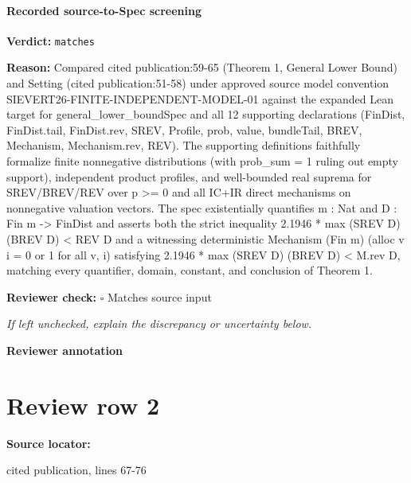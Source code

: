 \documentclass[10pt]{article}
\newcommand{\reviewerbox}{%
  \par\noindent\fbox{\parbox{0.96\linewidth}{\rule{0pt}{0.38in}}}\par
}
\newcommand{\reviewmatch}[1]{%
  \par\noindent\textbf{Reviewer check:} $\square$\; #1\par
  \noindent\emph{If left unchecked, explain the discrepancy or uncertainty below.}\par
}
\begin{document}
\paragraph{Recorded source-to-Spec screening}
\textbf{Verdict:} \texttt{matches}
\\
{\raggedright
\textbf{Reason:} Compared cited publication:\allowbreak{}59-\allowbreak{}65 (Theorem 1, General Lower Bound) and Setting (cited publication:\allowbreak{}51-\allowbreak{}58) under approved source model convention SIEVERT26-\allowbreak{}FINITE-\allowbreak{}INDEPENDENT-\allowbreak{}MODEL-\allowbreak{}01 against the expanded Lean target for general\_\allowbreak{}lower\_\allowbreak{}boundSpec and all 12 supporting declarations (FinDist, FinDist.\allowbreak{}tail, FinDist.\allowbreak{}rev, SREV, Profile, prob, value, bundleTail, BREV, Mechanism, Mechanism.\allowbreak{}rev, REV).\allowbreak{} The supporting definitions faithfully formalize finite nonnegative distributions (with prob\_\allowbreak{}sum = 1 ruling out empty support), independent product profiles, and well-\allowbreak{}bounded real suprema for SREV/\allowbreak{}BREV/\allowbreak{}REV over p >= 0 and all IC+IR direct mechanisms on nonnegative valuation vectors.\allowbreak{} The spec existentially quantifies m :\allowbreak{} Nat and D :\allowbreak{} Fin m -\allowbreak{}> FinDist and asserts both the strict inequality 2.\allowbreak{}1946 * max (SREV D) (BREV D) < REV D and a witnessing deterministic Mechanism (Fin m) (alloc v i = 0 or 1 for all v, i) satisfying 2.\allowbreak{}1946 * max (SREV D) (BREV D) < M.\allowbreak{}rev D, matching every quantifier, domain, constant, and conclusion of Theorem 1.\allowbreak{}
\par}
\reviewmatch{Matches source input}
\noindent\textbf{Reviewer annotation}\par
\reviewerbox
\clearpage
\hypertarget{source-claim-ee93e38fd4716dbe}{}
\section*{Review row 2}
\textbf{Source locator:} {\footnotesize\raggedright cited publication, lines 67-\allowbreak{}76\par}
\end{document}
